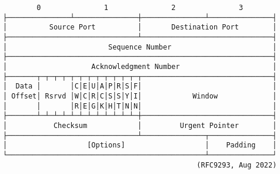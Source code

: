 \documentclass[varwidth=25cm,crop]{standalone}
\begin{document}
\begin{verbatim}
        0               1               2               3
├───────────────┴───────────────┼───────────────┴───────────────┤
│          Source Port          │       Destination Port        │
├───────────────────────────────┴───────────────────────────────┤
│                        Sequence Number                        │
├───────────────────────────────────────────────────────────────┤
│                    Acknowledgment Number                      │
├───────┬─┬─┬─┬─┬─┬─┬─┬─┬─┬─┬─┬─┬───────────────────────────────┤
│  Data │       │C│E│U│A│P│R│S│F│                               │
│ Offset│ Rsrvd │W│C│R│C│S│S│Y│I│            Window             │
│       │       │R│E│G│K│H│T│N│N│                               │
├───────┴─┴─┴─┴─┴─┴─┴─┴─┴─┴─┴─┴─┼───────────────────────────────┤
│           Checksum            │         Urgent Pointer        │
├───────────────────────────────┴───────────────┬───────────────┤
│                   [Options]                   │    Padding    │
└───────────────────────────────────────────────┴───────────────┘
                                              (RFC9293, Aug 2022)
\end{verbatim}
\end{document}
